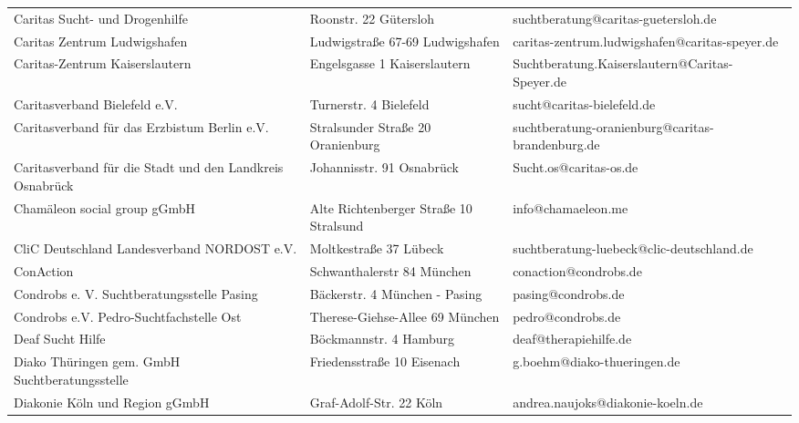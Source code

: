 {\begin{xltabular}{\textwidth} {
 >{\raggedright\arraybackslash}p{5cm}
 >{\raggedright\arraybackslash}X
 >{\raggedright\arraybackslash}p{5cm} }
Caritas Sucht- und Drogenhilfe & Roonstr. 22 Gütersloh & suchtberatung@caritas-guetersloh.de \\
Caritas Zentrum Ludwigshafen & Ludwigstraße 67-69 Ludwigshafen & caritas-zentrum.ludwigshafen@caritas-speyer.de \\
Caritas-Zentrum Kaiserslautern & Engelsgasse 1 Kaiserslautern & Suchtberatung.Kaiserslautern@Caritas-Speyer.de \\
Caritasverband Bielefeld e.V. & Turnerstr. 4 Bielefeld & sucht@caritas-bielefeld.de \\
Caritasverband für das Erzbistum Berlin e.V. & Stralsunder Straße 20 Oranienburg & suchtberatung-oranienburg@caritas-brandenburg.de \\
Caritasverband für die Stadt und den Landkreis Osnabrück & Johannisstr. 91 Osnabrück & Sucht.os@caritas-os.de \\
Chamäleon social group gGmbH & Alte Richtenberger Straße 10 Stralsund & info@chamaeleon.me \\
CliC Deutschland Landesverband NORDOST e.V. & Moltkestraße 37 Lübeck & suchtberatung-luebeck@clic-deutschland.de \\
ConAction & Schwanthalerstr 84 München & conaction@condrobs.de \\
Condrobs e. V. Suchtberatungsstelle Pasing & Bäckerstr. 4 München - Pasing & pasing@condrobs.de \\
Condrobs e.V. Pedro-Suchtfachstelle Ost & Therese-Giehse-Allee 69 München & pedro@condrobs.de \\
Deaf Sucht Hilfe & Böckmannstr. 4 Hamburg & deaf@therapiehilfe.de \\
Diako Thüringen gem. GmbH Suchtberatungsstelle & Friedensstraße 10 Eisenach & g.boehm@diako-thueringen.de \\
Diakonie Köln und Region gGmbH & Graf-Adolf-Str. 22 Köln & andrea.naujoks@diakonie-koeln.de \\

\end{xltabular}}
